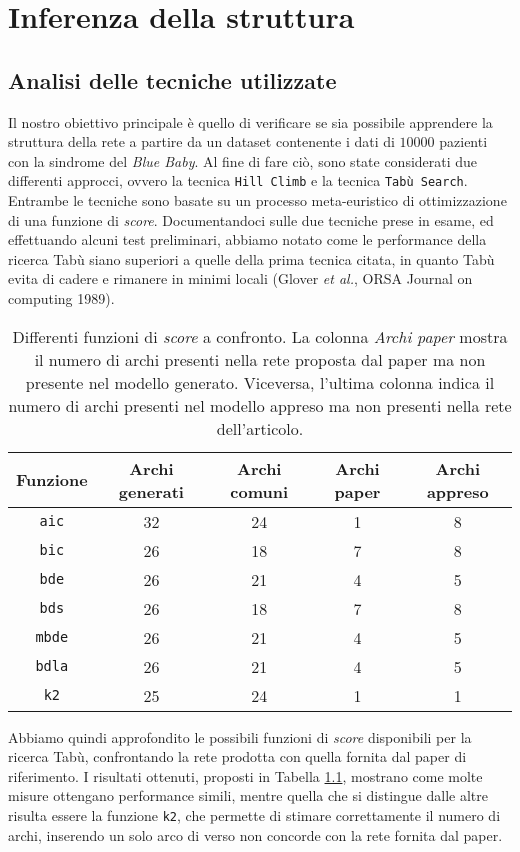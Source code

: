 \chapter{Inferenza della struttura}
\section{Analisi delle tecniche utilizzate}
\label{sec:misure}
Il nostro obiettivo principale è quello di verificare se sia possibile apprendere la struttura della rete a partire da un dataset contenente i dati di $10000$ pazienti con la sindrome del \textit{Blue Baby}. Al fine di fare ciò, sono state considerati due differenti approcci, ovvero la tecnica \texttt{Hill Climb} e la tecnica \texttt{Tabù Search}. Entrambe le tecniche sono basate su un processo meta-euristico di ottimizzazione di una funzione di \textit{score}. Documentandoci sulle due tecniche prese in esame, ed effettuando alcuni test preliminari, abbiamo notato come le performance della ricerca Tabù siano superiori a quelle della prima tecnica citata, in quanto Tabù evita di cadere e rimanere in minimi locali (Glover \textit{et al.}, ORSA Journal on computing 1989).\\
\begin{table}[t!]
	\centering
	\caption{Differenti funzioni di \textit{score} a confronto. La colonna \textit{Archi paper} mostra il numero di archi presenti nella rete proposta dal paper ma non presente nel modello generato. Viceversa, l'ultima colonna indica il numero di archi presenti nel modello appreso ma non presenti nella rete dell'articolo.}
	\begin{tabular}{|c|c|c|c|c|}
		\hline 
		Funzione & Archi generati  & Archi comuni & Archi paper & Archi appreso \\ 
		\hline 
		\texttt{aic} & 32 & 24 & 1 & 8 \\ 
		\hline 
		\texttt{bic} & 26 & 18 & 7 & 8 \\ 
		\hline 
		\texttt{bde} & 26 & 21 & 4 & 5 \\ 
		\hline 
		\texttt{bds} & 26 & 18 & 7 & 8 \\ 
		\hline 
		\texttt{mbde} & 26 & 21 & 4 & 5 \\ 
		\hline 
		\texttt{bdla} & 26 & 21 & 4 & 5 \\ 
		\hline 
		\texttt{k2} & 25 & 24 & 1 & 1 \\ 
		\hline 
	\end{tabular} 
	\label{tab:score}
\end{table}
Abbiamo quindi approfondito le possibili funzioni di \textit{score} disponibili per la ricerca Tabù, confrontando la rete prodotta con quella fornita dal paper di riferimento. I risultati ottenuti, proposti in Tabella \ref{tab:score}, mostrano come molte misure ottengano performance simili, mentre quella che si distingue dalle altre risulta essere la funzione \texttt{k2}, che permette di stimare correttamente il numero di archi, inserendo un solo arco di verso non concorde con la rete fornita dal paper.\\
